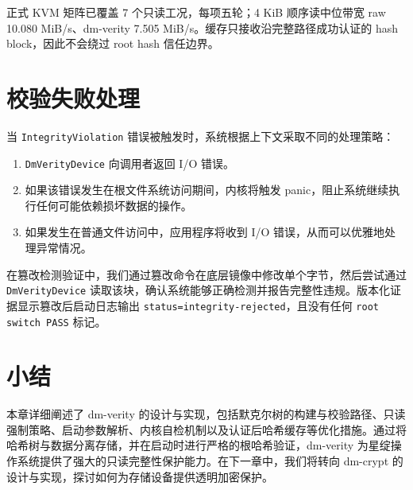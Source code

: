 正式 KVM 矩阵已覆盖 7 个只读工况，每项五轮；4 KiB 顺序读中位带宽 raw 10.080 MiB/s、dm-verity 7.505 MiB/s。缓存只接收沿完整路径成功认证的 hash block，因此不会绕过 root hash 信任边界。

\section{校验失败处理}

当 \texttt{IntegrityViolation} 错误被触发时，系统根据上下文采取不同的处理策略：

\begin{enumerate}
    \item \texttt{DmVerityDevice} 向调用者返回 I/O 错误。
    \item 如果该错误发生在根文件系统访问期间，内核将触发 panic，阻止系统继续执行任何可能依赖损坏数据的操作。
    \item 如果发生在普通文件访问中，应用程序将收到 I/O 错误，从而可以优雅地处理异常情况。
\end{enumerate}

在篡改检测验证中，我们通过篡改命令在底层镜像中修改单个字节，然后尝试通过 \texttt{DmVerityDevice} 读取该块，确认系统能够正确检测并报告完整性违规。版本化证据显示篡改后启动日志输出 \texttt{status=integrity-rejected}，且没有任何 \texttt{root switch PASS} 标记。

\section{小结}

本章详细阐述了 dm-verity 的设计与实现，包括默克尔树的构建与校验路径、只读强制策略、启动参数解析、内核自检机制以及认证后哈希缓存等优化措施。通过将哈希树与数据分离存储，并在启动时进行严格的根哈希验证，dm-verity 为星绽操作系统提供了强大的只读完整性保护能力。在下一章中，我们将转向 dm-crypt 的设计与实现，探讨如何为存储设备提供透明加密保护。
